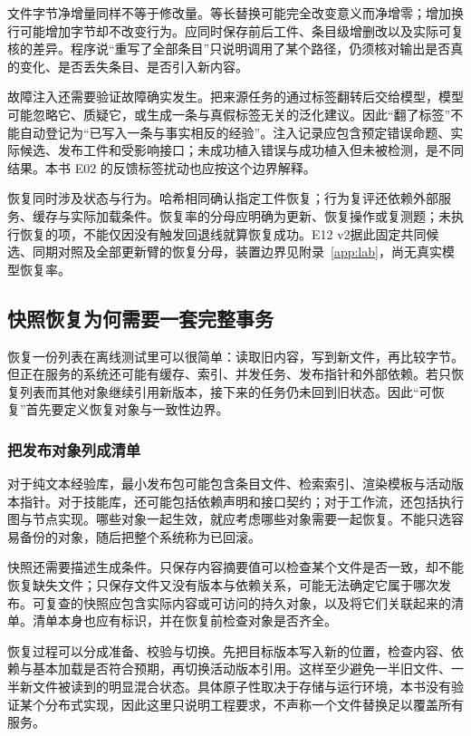 文件字节净增量同样不等于修改量。等长替换可能完全改变意义而净增零；增加换行可能增加字节却不改变行为。应同时保存前后工件、条目级增删改以及实际可复核的差异。程序说“重写了全部条目”只说明调用了某个路径，仍须核对输出是否真的变化、是否丢失条目、是否引入新内容。

故障注入还需要验证故障确实发生。把来源任务的通过标签翻转后交给模型，模型可能忽略它、质疑它，或生成一条与真假标签无关的泛化建议。因此“翻了标签”不能自动登记为“已写入一条与事实相反的经验”。注入记录应包含预定错误命题、实际候选、发布工件和受影响接口；未成功植入错误与成功植入但未被检测，是不同结果。本书 E02 的反馈标签扰动也应按这个边界解释。

恢复同时涉及状态与行为。哈希相同确认指定工件恢复；行为复评还依赖外部服务、缓存与实际加载条件。恢复率的分母应明确为更新、恢复操作或复测题；未执行恢复的项，不能仅因没有触发回退线就算恢复成功。E12 v2据此固定共同候选、同期对照及全部更新臂的恢复分母，装置边界见附录~\ref{app:lab}，尚无真实模型恢复率。


\subsection{快照恢复为何需要一套完整事务}
\label{sec:ch14-recovery-transaction}

恢复一份列表在离线测试里可以很简单：读取旧内容，写到新文件，再比较字节。但正在服务的系统还可能有缓存、索引、并发任务、发布指针和外部依赖。若只恢复列表而其他对象继续引用新版本，接下来的任务仍未回到旧状态。因此“可恢复”首先要定义恢复对象与一致性边界。

\subsubsection{把发布对象列成清单}

对于纯文本经验库，最小发布包可能包含条目文件、检索索引、渲染模板与活动版本指针。对于技能库，还可能包括依赖声明和接口契约；对于工作流，还包括执行图与节点实现。哪些对象一起生效，就应考虑哪些对象需要一起恢复。不能只选容易备份的对象，随后把整个系统称为已回滚。

快照还需要描述生成条件。只保存内容摘要值可以检查某个文件是否一致，却不能恢复缺失文件；只保存文件又没有版本与依赖关系，可能无法确定它属于哪次发布。可复查的快照应包含实际内容或可访问的持久对象，以及将它们关联起来的清单。清单本身也应有标识，并在恢复前检查对象是否齐全。

恢复过程可以分成准备、校验与切换。先把目标版本写入新的位置，检查内容、依赖与基本加载是否符合预期，再切换活动版本引用。这样至少避免一半旧文件、一半新文件被读到的明显混合状态。具体原子性取决于存储与运行环境，本书没有验证某个分布式实现，因此这里只说明工程要求，不声称一个文件替换足以覆盖所有服务。

